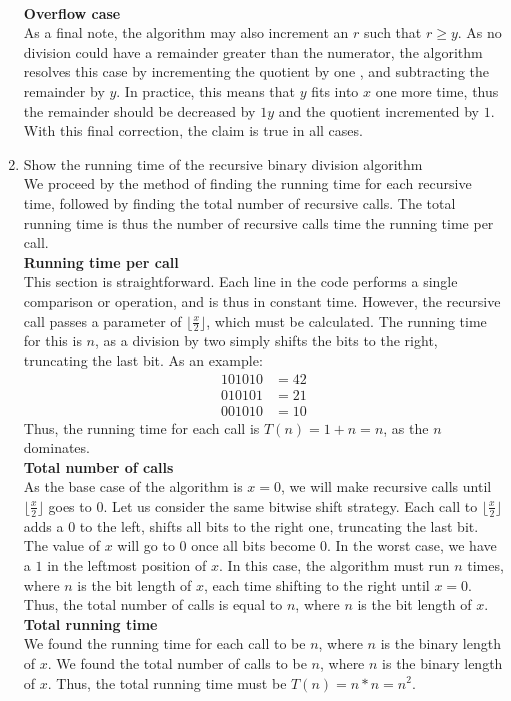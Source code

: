 \documentclass{article}
\begin{document}
\begin{enumerate}
	\\ \textbf{Overflow case} \\
	As a final note, the algorithm may also increment an $r$ such that $r\geq y$. As no division could have a remainder greater than the numerator, the algorithm resolves this case by incrementing the quotient by one	, and subtracting the remainder by $y$. In practice, this means that $y$ fits into $x$ one more time, thus the remainder should be decreased by $1y$ and the quotient incremented by $1$. With this final correction, the claim is true in all cases.
	\item Show the running time of the recursive binary division algorithm
	\\ We proceed by the method of finding the running time for each recursive time, followed by finding the total number of recursive calls. The total running time is thus the number of recursive calls time the running time per call. 
	\\ \textbf{Running time per call}
	\\ This section is straightforward. Each line in the code performs a single comparison or operation, and is thus in constant time. However, the recursive call passes a parameter of $\lfloor{\frac{x}{2}}\rfloor$, which must be calculated. The running time for this is $n$, as a division by two simply shifts the bits to the right, truncating the last bit. As an example:
	\begin{align}
	101010 &= 42 \\
	010101 &= 21 \\
	001010 &= 10 
	\end{align}
	Thus, the running time for each call is $T(n)=1+n=n$, as the $n$ dominates.
	\\ \textbf{Total number of calls}
	\\ As the base case of the algorithm is $x=0$, we will make recursive calls until $\lfloor{\frac{x}{2}}\rfloor$ goes to 0. Let us consider the same bitwise shift strategy. Each call to $\lfloor{\frac{x}{2}}\rfloor$ adds a 0 to the left, shifts all bits to the right one, truncating the last bit. The value of $x$ will go to 0 once all bits become 0. In the worst case, we have a $1$ in the leftmost position of $x$. In this case, the algorithm must run $n$ times, where $n$ is the bit length of $x$, each time shifting to the right until $x=0$. Thus, the total number of calls is equal to $n$, where $n$ is the bit length of $x$.
	\\ \textbf{Total running time}
	\\ We found the running time for each call to be $n$, where $n$ is the binary length of $x$. We found the total number of calls to be $n$, where $n$ is the binary length of $x$. Thus, the total running time must be $T(n)=n*n=n^2$.

\end{enumerate}
\end{document}
